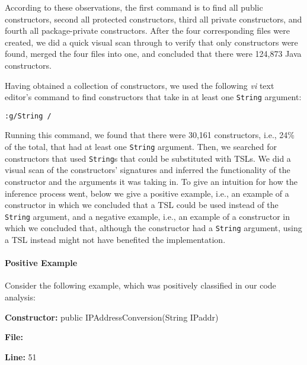 According to these observations, the first command is to find all public constructors, second all protected constructors, third all private constructors, and fourth all package-private constructors. After the four corresponding files were created, we did a quick visual scan through to verify that only constructors were found, merged the four files into one, and concluded that there were 124,873 Java constructors.

Having obtained a collection of constructors, we used the following \emph{vi} text editor's command to find constructors that take in at least one \lstinline{String} argument:

\begin{lstlisting}
:g/String /
\end{lstlisting}

Running this command, we found that there were 30,161 constructors, i.e., 24\% of the total, that had at least one \lstinline{String} argument. Then, we searched for constructors that used \lstinline{String}s that could be substituted with TSLs. We did a visual scan of the constructors' signatures and inferred the functionality of the constructor and the arguments it was taking in. To give an intuition for how the inference process went, below we give a positive example, i.e., an example of a constructor in which we concluded that a TSL could be used instead of the \lstinline{String} argument, and a negative example, i.e., an example of a constructor in which we concluded that, although the constructor had a \lstinline{String} argument, using a TSL instead might not have benefited the implementation.


\paragraph{Positive Example} Consider the following example, which was positively classified in our code analysis:

\vspace{10px}

\begin{small}

\noindent \textbf{Constructor:} public IPAddressConversion(String IPaddr)

\noindent \textbf{File:} 

\noindent \textbf{Line:} 51

\end{small}

